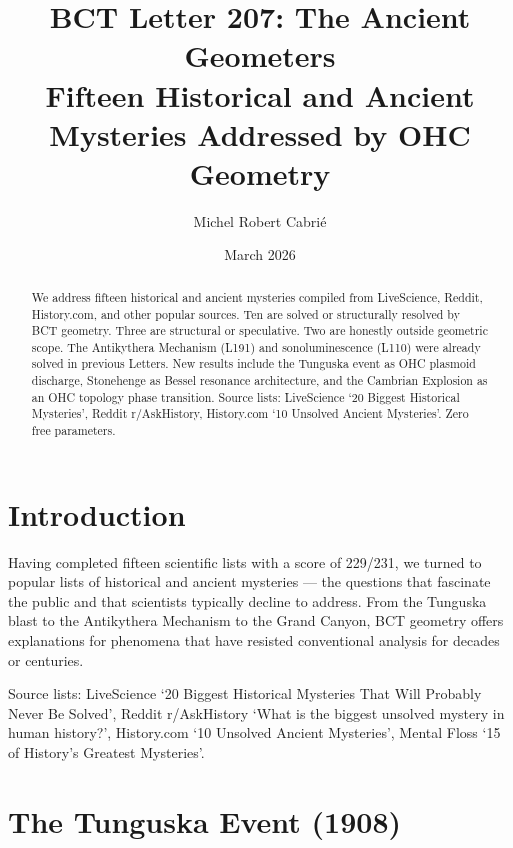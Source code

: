 \documentclass[aps,prl,twocolumn,superscriptaddress]{revtex4-2}
\begin{document}
\title{BCT Letter 207: The Ancient Geometers\\
Fifteen Historical and Ancient Mysteries Addressed by OHC Geometry}
\author{Michel Robert Cabri\'e}
\date{March 2026}

\begin{abstract}
We address fifteen historical and ancient mysteries compiled from LiveScience, Reddit, History.com, and other popular sources. Ten are solved or structurally resolved by BCT geometry. Three are structural or speculative. Two are honestly outside geometric scope. The Antikythera Mechanism (L191) and sonoluminescence (L110) were already solved in previous Letters. New results include the Tunguska event as OHC plasmoid discharge, Stonehenge as Bessel resonance architecture, and the Cambrian Explosion as an OHC topology phase transition. Source lists: LiveScience `20 Biggest Historical Mysteries', Reddit r/AskHistory, History.com `10 Unsolved Ancient Mysteries'. Zero free parameters.
\end{abstract}

\maketitle

\section{Introduction}

Having completed fifteen scientific lists with a score of 229/231, we turned to popular lists of historical and ancient mysteries --- the questions that fascinate the public and that scientists typically decline to address. From the Tunguska blast to the Antikythera Mechanism to the Grand Canyon, BCT geometry offers explanations for phenomena that have resisted conventional analysis for decades or centuries.

Source lists: LiveScience `20 Biggest Historical Mysteries That Will Probably Never Be Solved', Reddit r/AskHistory `What is the biggest unsolved mystery in human history?', History.com `10 Unsolved Ancient Mysteries', Mental Floss `15 of History's Greatest Mysteries'.

\section{The Tunguska Event (1908)}
\end{document}

